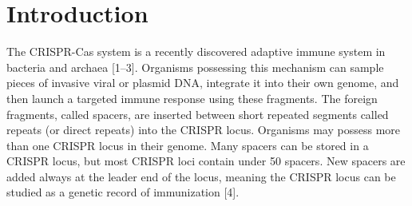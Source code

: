\documentclass{bmcart}
\begin{document}
\begin{frontmatter}
\begin{abstractbox}

\begin{keyword}
\end{keyword}


\end{abstractbox}
%

\end{frontmatter}



\section*{Introduction}
The CRISPR-Cas system is a recently discovered adaptive immune system in bacteria and archaea  [1–3]. Organisms possessing this mechanism can sample pieces of invasive viral or plasmid DNA, integrate it into their own genome, and then launch a targeted immune response using these fragments. The foreign fragments, called spacers, are inserted between short repeated segments called repeats (or direct repeats) into the CRISPR locus. Organisms may possess more than one CRISPR locus in their genome. Many spacers can be stored in a CRISPR locus, but most CRISPR loci contain under 50 spacers. New spacers are added always at the leader end of the locus, meaning the CRISPR locus can be studied as a genetic record of immunization  [4].
\end{document}
